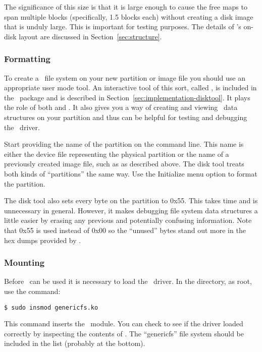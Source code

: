 The significance of this size is that it is large enough to cause the free maps to span multiple
blocks (specifically, 1.5 blocks each) without creating a disk image that is unduly large. This
is important for testing purposes. The details of \GenericFS's on-disk layout are discussed in
Section~\ref{sec:structure}.

\subsubsection{Formatting}

To create a \GenericFS\ file system on your new partition or image file you should use an
appropriate user mode tool. An interactive tool of this sort, called , is
included in the \GenericFS\ package and is described in
Section~\ref{sec:implementation-disktool}. It plays the role of both  and
. It also gives you a way of creating and viewing \GenericFS\ data structures on
your partition and thus can be helpful for testing and debugging the \GenericFS\ driver.

Start  providing the name of the partition on the command line. This name is
either the device file representing the physical partition or the name of a previously created
image file, such as  as described above. The disk tool treats both kinds of
``partitions'' the same way. Use the Initialize menu option to format the partition.

The disk tool also sets every byte on the partition to 0x55. This takes time and is unnecessary
in general. However, it makes debugging file system data structures a little easier by erasing
any previous and potentially confusing information. Note that 0x55 is used instead of 0x00 so
the ``unused'' bytes stand out more in the hex dumps provided by .

\subsubsection{Mounting}

Before \GenericFS\ can be used it is necessary to load the \GenericFS\ driver. In the
 directory, as root, use the command:
\begin{verbatim}
$ sudo insmod genericfs.ko
\end{verbatim}

This command inserts the \GenericFS\ module. You can check to see if the driver loaded correctly
by inspecting the contents of . The ``genericfs'' file system should
be included in the list (probably at the bottom).

